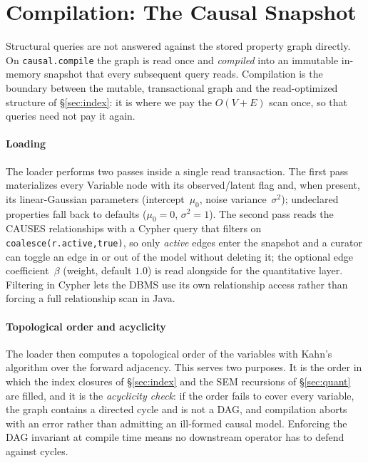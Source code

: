 \section{Compilation: The Causal Snapshot}\label{sec:compile}

Structural queries are not answered against the stored property graph directly.
On \texttt{causal.compile} the graph is read once and \emph{compiled} into an
immutable in-memory snapshot that every subsequent query reads. Compilation is
the boundary between the mutable, transactional graph and the read-optimized
structure of \S\ref{sec:index}: it is where we pay the $O(V{+}E)$ scan once, so
that queries need not pay it again.

\paragraph{Loading}
The loader performs two passes inside a single read transaction. The first pass
materializes every \textsf{Variable} node with its \textsf{observed}/\textsf{latent}
flag and, when present, its linear-Gaussian parameters (intercept~$\mu_0$, noise
variance~$\sigma^2$); undeclared properties fall back to defaults ($\mu_0{=}0$,
$\sigma^2{=}1$). The second pass reads the \textsf{CAUSES} relationships with a
Cypher query that filters on \lstinline[style=causaldsl]|coalesce(r.active,true)|,
so only \emph{active} edges enter the snapshot and a curator can toggle an edge
in or out of the model without deleting it; the optional edge coefficient~$\beta$
(\textsf{weight}, default $1.0$) is read alongside for the quantitative layer.
Filtering in Cypher lets the DBMS use its own relationship access rather than
forcing a full relationship scan in Java.

\paragraph{Topological order and acyclicity}
The loader then computes a topological order of the variables with Kahn's
algorithm over the forward adjacency. This serves two purposes. It is the order
in which the index closures of \S\ref{sec:index} and the SEM recursions of
\S\ref{sec:quant} are filled, and it is the \emph{acyclicity check}: if the order
fails to cover every variable, the graph contains a directed cycle and is not a
DAG, and compilation aborts with an error rather than admitting an ill-formed
causal model. Enforcing the DAG invariant at compile time means no downstream
operator has to defend against cycles.

